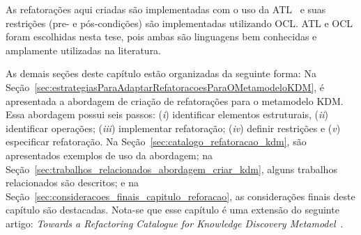 





As refatorações aqui criadas são implementadas com o uso da ATL~\cite{Allilaire_06, Jouault_2005, Jouault_2008} e suas restrições (pre- e pós-condições) são implementadas utilizando OCL. ATL e OCL foram escolhidas nesta tese, pois ambas são linguagens bem conhecidas e amplamente utilizadas na literatura.%

As demais seções deste capítulo estão organizadas da seguinte forma: Na Seção~\ref{sec:estrategiasParaAdaptarRefatoracoesParaOMetamodeloKDM}, é apresentada a abordagem de criação de refatorações para o metamodelo KDM. Essa abordagem possui seis passos: (\textit{i}) identificar elementos estruturais, (\textit{ii}) identificar operações; (\textit{iii}) implementar refatoração; (\textit{iv}) definir restrições e (\textit{v}) especificar refatoração. Na Seção~\ref{sec:catalogo_refatoracao_kdm}, são apresentados exemplos de uso da abordagem; na Seção~\ref{sec:trabalhos_relacionados_abordagem_criar_kdm}, alguns trabalhos relacionados são descritos; e na Seção~\ref{sec:consideracoes_finais_capitulo_reforacao}, as considerações finais deste capítulo são destacadas. Nota-se que esse capítulo é uma extensão do seguinte artigo: \textit{Towards a Refactoring Catalogue for Knowledge Discovery Metamodel}~\cite{durelli_catalogo}.

